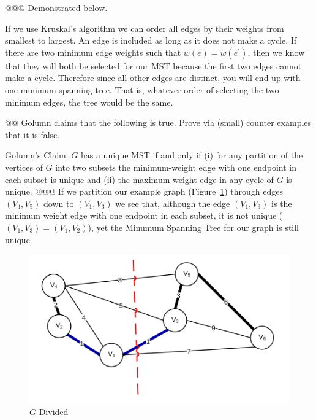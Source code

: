 \documentclass[10pt]{article}\usepackage[]{graphicx}\usepackage[]{xcolor}
\makeatletter
\newenvironment{kframe}{%
 \def\at@end@of@kframe{}%
 \ifinner\ifhmode%
  \def\at@end@of@kframe{\end{minipage}}%
  \begin{minipage}{\columnwidth}%
 \fi\fi%
 \def\FrameCommand##1{\hskip\@totalleftmargin \hskip-\fboxsep
 \colorbox{shadecolor}{##1}\hskip-\fboxsep
     \hskip-\linewidth \hskip-\@totalleftmargin \hskip\columnwidth}%
 \MakeFramed {\advance\hsize-\width
   \@totalleftmargin\z@ \linewidth\hsize
   \@setminipage}}%
 {\par\unskip\endMakeFramed%
 \at@end@of@kframe}
\newenvironment{knitrout}{}{} %
\makeatother
\begin{document}
\begin{easylist}[enumerate]
    @@@ Demonstrated below.

\begin{knitrout}
\color{fgcolor}\begin{kframe}


{\ttfamily\noindent\bfseries{}}

{\ttfamily\noindent\bfseries{}}\end{kframe}
\end{knitrout}

    If we use Kruskal's algorithm we can order all edges by their weights from smallest to largest. An edge is included
    as long as it does not make a cycle. If there are two minimum edge weights such that $w(e) = w(e^\prime)$, then we
    know that they will both be selected for our MST because the first two edges cannot make a cycle. Therefore since
    all other edges are distinct, you will end up with one minimum spanning tree. That is, whatever order of selecting
    the two minimum edges, the tree would be the same.

    @@ Golumn claims that the following is true. Prove via (small) counter examples that it is false.

    Golumn's Claim: $G$ has a unique MST if and only if (i) for any partition of the vertices of $G$ into two subsets
    the minimum-weight edge with one endpoint in each subset is unique and (ii) the maximum-weight edge in any cycle of
    $G$ is unique.
    @@@ If we partition our example graph (Figure~\ref{fig:3ba}) through edges $(V_4 , V_5)$ down to $(V_1, V_3)$ we see
    that, although the edge $(V_1, V_3)$ is the minimum weight edge with one endpoint in each subset, it is not unique
    ($(V_1 , V_3) = (V_1, V_2)$), yet the Minumum Spanning Tree for our graph is still unique.

    \begin{figure}[H]
        \centering
        \includegraphics[scale=0.5]{./img/ps8/3b1.png}
        \caption{$G$ Divided}
        \label{fig:3ba}
    \end{figure}


\end{easylist}
\end{document}
